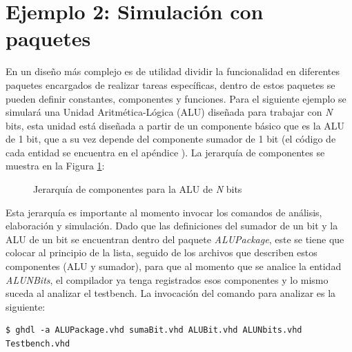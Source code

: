 \documentclass[11pt]{article}
\begin{document}
\section{Ejemplo 2: Simulación con paquetes}\label{sim-2}

En un diseño más complejo es de utilidad dividir la funcionalidad en diferentes
paquetes encargados de realizar tareas específicas, dentro de estos paquetes se
pueden definir constantes, componentes y funciones. Para el siguiente ejemplo
se simulará una Unidad Aritmética-Lógica (ALU) diseñada para trabajar con
\textit{N} bits, esta unidad está diseñada a partir de un componente básico que 
es la ALU de 1 bit, que a su vez depende del componente sumador de 1 bit (el
código de cada entidad se encuentra en el apéndice ). La
jerarquía de componentes se muestra en la Figura \ref{fig:alu-jerarquia}:

\begin{figure}[H]
\centering
{}
\caption{Jerarquía de componentes para la ALU de \textit{N} bits}
\label{fig:alu-jerarquia}
\end{figure}

Esta jerarquía es importante al momento invocar los comandos de análisis,
elaboración y simulación. Dado que las definiciones del sumador de un bit y la
ALU de un bit se encuentran dentro del paquete \textit{ALUPackage}, este se tiene que
colocar al principio de la lista, seguido de los archivos que describen estos
componentes (ALU y sumador), para que al momento que se analice la entidad
\textit{ALUNBits}, el compilador ya tenga registrados esos componentes y lo mismo suceda
al analizar el testbench. La invocación del comando para analizar es la siguiente:

\begin{Verbatim}[frame=single] 
$ ghdl -a ALUPackage.vhd sumaBit.vhd ALUBit.vhd ALUNbits.vhd Testbench.vhd 
\end{Verbatim}
\end{document}
